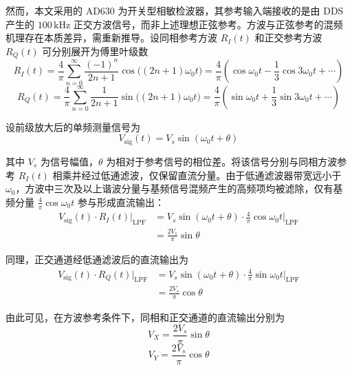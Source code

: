 然而，本文采用的 AD630 为开关型相敏检波器，其参考输入端接收的是由 DDS 产生的 $100\,\mathrm{kHz}$ 正交方波信号，而非上述理想正弦参考。方波与正弦参考的混频机理存在本质差异，需重新推导。设同相参考方波 $R_I(t)$ 和正交参考方波 $R_Q(t)$ 可分别展开为傅里叶级数
\begin{equation}
\label{eq:square_wave_I}
R_I(t) = \frac{4}{\pi} \sum_{n=0}^{\infty} \frac{(-1)^n}{2n+1} \cos\!\bigl((2n+1)\omega_0 t\bigr)
= \frac{4}{\pi}\!\left( \cos\omega_0 t - \frac{1}{3}\cos3\omega_0 t + \cdots \right) 
\end{equation}
\begin{equation}
\label{eq:square_wave_Q}
R_Q(t) = \frac{4}{\pi} \sum_{n=0}^{\infty} \frac{1}{2n+1} \sin\!\bigl((2n+1)\omega_0 t\bigr)
= \frac{4}{\pi}\!\left( \sin\omega_0 t + \frac{1}{3}\sin3\omega_0 t +  \cdots \right) 
\end{equation}

设前级放大后的单频测量信号为
\begin{equation}
\label{eq:sig_signal}
V_{\mathrm{sig}}(t) = V_s \sin(\omega_0 t + \theta) 
\end{equation}

其中 $V_s$ 为信号幅值，$\theta$ 为相对于参考信号的相位差。将该信号分别与同相方波参考 $R_I(t)$ 相乘并经过低通滤波，仅保留直流分量。由于低通滤波器带宽远小于 $\omega_0$，方波中三次及以上谐波分量与基频信号混频产生的高频项均被滤除，仅有基频分量 $\frac{4}{\pi}\cos\omega_0 t$ 参与形成直流输出：
\begin{equation}
\label{eq:square_mix_I}
\begin{split}
V_{\mathrm{sig}}(t) \cdot R_I(t) \big|_{\mathrm{LPF}} 
&= V_s \sin(\omega_0 t + \theta) \cdot \frac{4}{\pi}\cos\omega_0 t \big|_{\mathrm{LPF}} \\
&= \frac{2V_s}{\pi} \sin\theta 
\end{split}
\end{equation}

同理，正交通道经低通滤波后的直流输出为
\begin{equation}
\label{eq:square_mix_Q}
\begin{split}
V_{\mathrm{sig}}(t) \cdot R_Q(t) \big|_{\mathrm{LPF}}
&= V_s \sin(\omega_0 t + \theta) \cdot \frac{4}{\pi}\sin\omega_0 t \big|_{\mathrm{LPF}} \\
&= \frac{2V_s}{\pi} \cos\theta 
\end{split}
\end{equation}

由此可见，在方波参考条件下，同相和正交通道的直流输出分别为
\begin{equation}
\label{eq:lockin_x}
V_X = \frac{2V_s}{\pi} \sin\theta 
\end{equation}
\begin{equation}
\label{eq:lockin_y}
V_Y = \frac{2V_s}{\pi} \cos\theta 
\end{equation}

